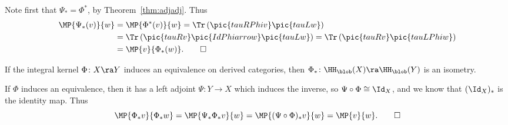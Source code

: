 \begin{Proof}
  Note first that $\Psi_*=\Phi^*$, by Theorem~\ref{thm:adjadj}.  Thus
  \begin{align*}
    \MP{\Psi_*(v)}{w}&=\MP{\Phi^*(v)}{w}
    =\Tr\left(\pic{tauRPhiv}\pic{tauLw}\right)\\
    &=\Tr\left(\pic{tauRv}\pic{IdPhiarrow}\pic{tauLw}\right)
    =\Tr\left(\pic{tauRv}\pic{tauLPhiw}\right)\\
    &=\MP{v}{\Phi_*(w)}.\qedhere
  \end{align*}
\end{Proof}

\begin{Corollary}
  If the integral kernel $\Phi\colon X \ra Y$ induces an equivalence
  on derived categories, then $\Phi_*\colon\HH_\blob(X) \ra
  \HH_\blob(Y)$ is an isometry.
\end{Corollary}

\begin{Proof}
  If $\Phi$ induces an equivalence, then it has a left adjoint
  $\Psi\colon Y\to X$ which induces the inverse, so
  $\Psi\circ\Phi\cong \Id_X$, and we know that $(\Id_X)_*$
  is the identity map.  Thus
  \[ \MP{\Phi_* v}{\Phi_* w} = \MP{\Psi_* \Phi_* v}{w} =
  \MP{(\Psi\circ \Phi)_* v}{w}= \MP{v}{w}.\qedhere \]
\end{Proof}
